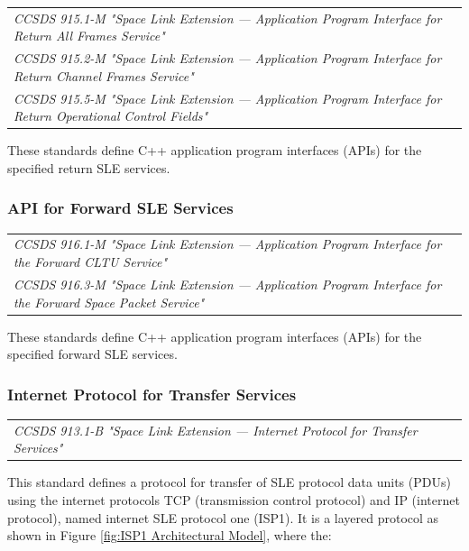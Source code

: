 \begin{tabular}{l}
\textit{CCSDS 915.1-M "Space Link Extension — Application Program Interface for Return All Frames Service" \cite{CCSDS-915.1-M}} \\
\textit{CCSDS 915.2-M "Space Link Extension — Application Program Interface for Return Channel Frames Service" \cite{CCSDS-915.2-M}} \\
\textit{CCSDS 915.5-M "Space Link Extension — Application Program Interface for Return Operational Control Fields" \cite{CCSDS-915.5-M}} \\
\end{tabular}

These standards define C++ application program interfaces (APIs) for the specified return SLE services.

\subsubsection{API for Forward SLE Services}

\begin{tabular}{l}
\textit{CCSDS 916.1-M "Space Link Extension — Application Program Interface for the Forward CLTU Service" \cite{CCSDS-916.1-M}} \\
\textit{CCSDS 916.3-M "Space Link Extension — Application Program Interface for the Forward Space Packet Service" \cite{CCSDS-916.3-M}} \\
\end{tabular}

These standards define C++ application program interfaces (APIs) for the specified forward SLE services.

\subsubsection{Internet Protocol for Transfer Services}

\begin{tabular}{l}
\textit{CCSDS 913.1-B "Space Link Extension — Internet Protocol for Transfer Services" \cite{CCSDS-913.1-B}} \\
\end{tabular}

This standard defines a protocol for transfer of SLE protocol data units (PDUs) using the internet protocols TCP (transmission control protocol) and IP (internet protocol), named internet SLE protocol one (ISP1). It is a layered protocol as shown in Figure \ref{fig:ISP1 Architectural Model}, where the:

